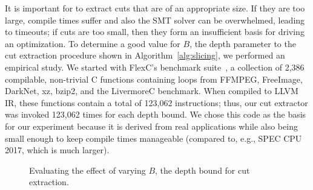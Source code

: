 It is important for \minotaur{} to extract cuts that are of an appropriate
size.
%
If they are too large, compile times suffer and also the SMT solver
can be overwhelmed, leading to timeouts; if cuts are too small, then
they form an insufficient basis for driving an optimization.
%
To determine a good value for $B$, the depth parameter to the cut
extraction procedure shown in Algorithm~\ref{alg:slicing}, we
performed an empirical study.
%
We started with FlexC's benchmark suite~\cite{woodruff2023rewriting},
a collection of 2,386 compilable, non-trivial C functions containing
loops from FFMPEG, FreeImage, DarkNet, xz, bzip2, and the LivermoreC
benchmark.
%
When compiled to LLVM IR, these functions contain a total of 123,062
instructions; thus, our cut extractor was invoked 123,062 times for
each depth bound.
%
We chose this code as the basis for our experiment because it is
derived from real applications while also being small enough to
keep compile times manageable (compared to, e.g., SPEC CPU 2017,
which is much larger).


\begin{figure}[bp]
  \centering
  \hfill
  \hfill
  \caption{Evaluating the effect of varying $B$, the depth bound for
    cut extraction.}
  \label{fig:loop}
\end{figure}


